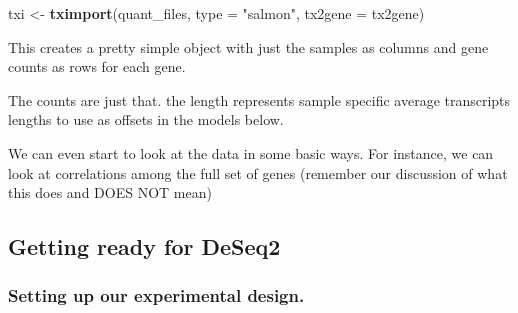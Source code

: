 \documentclass[
]{article}
\newenvironment{Shaded}{\begin{snugshade}}{\end{snugshade}}
\newcommand{\DataTypeTok}[1]{\textcolor[rgb]{0.13,0.29,0.53}{#1}}
\newcommand{\DecValTok}[1]{\textcolor[rgb]{0.00,0.00,0.81}{#1}}
\newcommand{\KeywordTok}[1]{\textcolor[rgb]{0.13,0.29,0.53}{\textbf{#1}}}
\newcommand{\NormalTok}[1]{#1}
\newcommand{\OperatorTok}[1]{\textcolor[rgb]{0.81,0.36,0.00}{\textbf{#1}}}
\newcommand{\OtherTok}[1]{\textcolor[rgb]{0.56,0.35,0.01}{#1}}
\newcommand{\StringTok}[1]{\textcolor[rgb]{0.31,0.60,0.02}{#1}}
\begin{document}
\begin{Shaded}
\begin{Highlighting}[]
\NormalTok{txi <-}\StringTok{ }\KeywordTok{tximport}\NormalTok{(quant_files, }
                \DataTypeTok{type =} \StringTok{"salmon"}\NormalTok{, }\DataTypeTok{tx2gene =}\NormalTok{ tx2gene)}
\end{Highlighting}
\end{Shaded}

This creates a pretty simple object with just the samples as columns and
gene counts as rows for each gene.

\begin{Shaded}
\end{Shaded}

The counts are just that. the length represents sample specific average
transcripts lengths to use as offsets in the models below.

We can even start to look at the data in some basic ways. For instance,
we can look at correlations among the full set of genes (remember our
discussion of what this does and DOES NOT mean)

\begin{Shaded}
\end{Shaded}

\hypertarget{getting-ready-for-deseq2}{%
\subsection{Getting ready for DeSeq2}\label{getting-ready-for-deseq2}}

\hypertarget{setting-up-our-experimental-design.}{%
\subsubsection{Setting up our experimental
design.}\label{setting-up-our-experimental-design.}}
\end{document}
